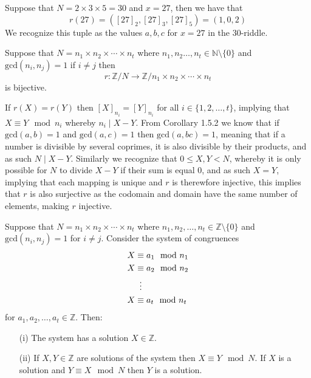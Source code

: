 \begin{exmp}
  Suppose that $N=2\times 3\times 5=30$ and $x=27$, then we have that
  \[
      r(27)=\left([27]_{2},[27]_{3},[27]_{5}\right)=(1,0,2)
  \]
  We recognize this tuple as the values $a,b,c$ for $x=27$ in the 30-riddle.
\end{exmp}
\begin{lemm}
    Suppose that $N=n_{1}\times n_{2}\times\cdots\times n_{t}$ where $n_{1},n_{2}\ldots,n_{t}\in\mathbb{N}\setminus\{0\}$ and $\text{gcd}(n_{i},n_{j})=1$ if $i\neq j$ then
    \[
        r:\mathbb{Z}/N\rightarrow\mathbb{Z}/n_{1}\times n_{2}\times\cdots\times n_{t}
    \]
    is bijective.
\end{lemm}
\begin{prf}
    If $r(X)=r(Y)$ then $[X]_{n_{i}}=[Y]_{n_{i}}$ for all $i\in\{1,2,\ldots,t\}$, implying that $X\equiv Y\mod n_{i}$ whereby $n_{i}\mid X-Y$. From Corollary 1.5.2 we know that if $\text{gcd}(a,b)=1$ and $\text{gcd}(a,c)=1$ then $\text{gcd}(a,bc)=1$, meaning that if a number is divisible by several coprimes, it is also divisible by their products, and as such $N\mid X-Y$. Similarly we recognize that $0\leq X,Y<N$, whereby it is only possible for $N$ to divide $X-Y$ if their sum is equal 0, and as such $X=Y$, implying that each mapping is unique and $r$ is therewfore injective, this implies that $r$ is also surjective as the codomain and domain have the same number of elements, making $r$ injective.
\end{prf}
\begin{theo}
    Suppose that $N=n_{1}\times n_{2}\times\cdots\times n_{t}$ where $n_{1},n_{2},\ldots,n_{t}\in\mathbb{Z}\setminus\{0\}$ and $\text{gcd}(n_{i},n_{j})=1$ for $i\neq j$. Consider the system of congruences
    \begin{align*}
        X&\equiv a_{1}\mod n_{1} \\
      X&\equiv a_{2}\mod n_{2} \\
       &\vdotswithin{\equiv} \\
      X&\equiv a_{t}\mod n_{t}
    \end{align*}
    for $a_{1},a_{2},\ldots,a_{t}\in\mathbb{Z}$. Then:
    \begin{itemize}
        \item[(i)] The system has a solution $X\in\mathbb{Z}$.
        \item[(ii)] If $X,Y\in\mathbb{Z}$ are solutions of the system then $X\equiv Y\mod N$. If $X$ is a solution and $Y\equiv X\mod N$ then $Y$ is a solution.
    \end{itemize}
\end{theo}
